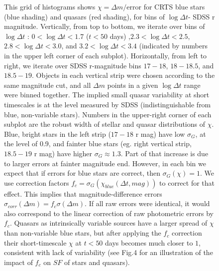 \documentclass[fleqn,usenatbib]{mnras}  %
\begin{document}
\begin{figure}
 \caption{This grid of histograms shows $\chi = \Delta m / \mathrm{error}$ for CRTS blue stars (blue shading) and quasars (red shading), for bins of $\log{\Delta t}$- SDSS r magnitude. Vertically, from top to bottom, we iterate over bins of $\log{\Delta t}$ : $0<\log{\Delta t}<1.7$ ($t < 50 $ days) ,$2.3<\log{\Delta t}<2.5$, $2.8<\log{\Delta t}<3.0$, and $3.2<\log{\Delta t}<3.4$ (indicated by numbers in the upper left corner of each subplot). Horizontally, from left to right, we iterate over SDSS r-magnitude bins $17-18$,  $18-18.5$, and $18.5-19$. Objects in each vertical strip were chosen according to the same magnitude cut, and all $\Delta m$ points in a given  $\log{\Delta t}$ range were binned together. The  implied small quasar variability at short timescales is at the level  measured by SDSS (indistinguishable from blue, non-variable stars). Numbers in the upper-right corner of each subplot are the robust width of stellar  and quasar  distributions of $\chi$. Blue, bright  stars in the left strip ($17-18$ r mag) have low $\sigma_{G}$, at the level of 0.9, and fainter blue stars (eg. right vertical strip, $18.5-19$ r mag) have higher $\sigma_{G} \approx 1.3$. Part of that increase is due to larger errors at fainter magnitude end. However, in each bin we expect that if errors for blue stars are correct, then  $\sigma_{G}(\chi) = 1$. We use  correction factors $f_{c} = \sigma_{G}(\chi_{blue}(\Delta t, mag))$ to correct for that effect. This implies that magnitude-difference errors  $\sigma_{corr} (\Delta m) = f_{c}\sigma (\Delta m) $. If all raw errors were identical, it would also correspond to the linear correction of raw photometric errors by $f_{c}$. Quasars  as intrinsically variable sources have a larger spread of $\chi$ than non-variable blue stars, but after applying the $f_{c}$ correction their short-timescale $\chi$ at $t < 50$ days becomes much closer to $1$, consistent with lack of variability (see Fig.4 for an illustration of the impact of $f_{c}$ on $SF$ of stars and quasars).}
\end{figure}

\end{document}
